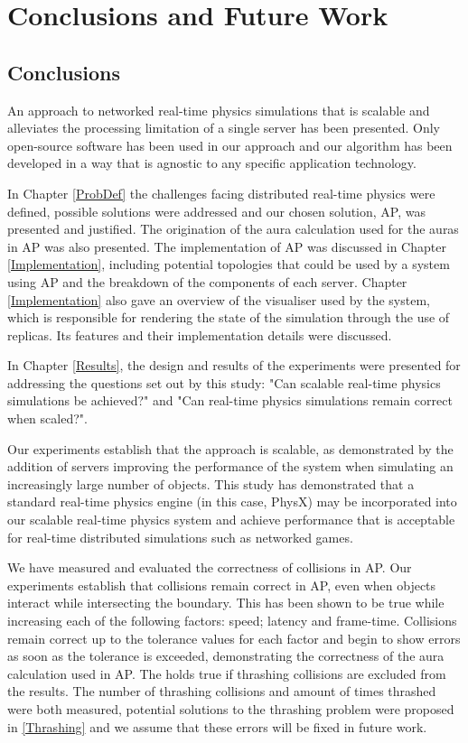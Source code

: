 \chapter{Conclusions and Future Work}
\section{Conclusions}
An approach to networked real-time physics simulations that is scalable and alleviates the processing limitation of a single server has been presented. Only open-source software has been used in our approach and our algorithm has been developed in a way that is agnostic to any specific application technology.

In Chapter \ref{ProbDef} the challenges facing distributed real-time physics were defined, possible solutions were addressed and our chosen solution, AP, was presented and justified. The origination of the aura calculation used for the auras in AP was also presented. The implementation of AP was discussed in Chapter \ref{Implementation}, including potential topologies that could be used by a system using AP and the breakdown of the components of each server. Chapter \ref{Implementation} also gave an overview of the visualiser used by the system, which is responsible for rendering the state of the simulation through the use of replicas. Its features and their implementation details were discussed.

In Chapter \ref{Results}, the design and results of the experiments were presented for addressing the questions set out by this study: "Can scalable real-time physics simulations be achieved?" and "Can real-time physics simulations remain correct when scaled?".

Our experiments establish that the approach is scalable, as demonstrated by the addition of servers improving the performance of the system when simulating an increasingly large number of objects. This study has demonstrated that a standard real-time physics engine (in this case, PhysX) may be incorporated into our scalable real-time physics system and achieve performance that is acceptable for real-time distributed simulations such as networked games.

We have measured and evaluated the correctness of collisions in AP. Our experiments establish that collisions remain correct in AP, even when objects interact while intersecting the boundary. This has been shown to be true while increasing each of the following factors: speed; latency and frame-time. Collisions remain correct up to the tolerance values for each factor and begin to show errors as soon as the tolerance is exceeded, demonstrating the correctness of the aura calculation used in AP. The holds true if thrashing collisions are excluded from the results. The number of thrashing collisions and amount of times thrashed were both measured, potential solutions to the thrashing problem were proposed in \ref{Thrashing} and we assume that these errors will be fixed in future work.

